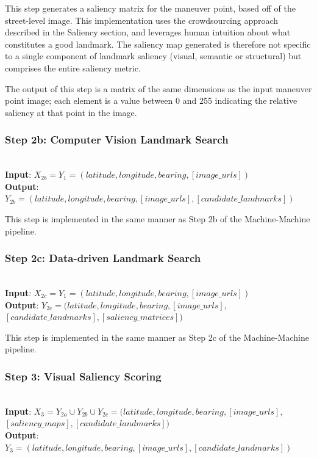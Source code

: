 This step generates a saliency matrix for the maneuver point, based off of the street-level image. This implementation uses the crowdsourcing approach described in the Saliency section, and leverages human intuition about what constitutes a good landmark. The saliency map generated is therefore not specific to a single component of landmark saliency (visual, semantic or structural) but comprises the entire saliency metric. 

The output of this step is a matrix of the same dimensions as the input maneuver point image; each element is a value between 0 and 255 indicating the relative saliency at that point in the image.

\subsubsection*{Step 2b: Computer Vision Landmark Search}~\\
\noindent\textbf{Input}: $X_{2b} = Y_1 = (latitude, longitude, bearing, [image\_urls])$\\
\textbf{Output}: $Y_{2b} = (latitude, longitude, bearing,  [image\_urls], [candidate\_landmarks] )$ 

This step is implemented in the same manner as Step 2b of the Machine-Machine pipeline.

\subsubsection*{Step 2c: Data-driven Landmark Search}~\\
\noindent\textbf{Input}: $X_{2c} = Y_1 = (latitude, longitude, bearing, [image\_urls])$\\
\textbf{Output}: $Y_{2c} = (latitude, longitude, bearing,  [image\_urls], $\\$[candidate\_landmarks], [saliency\_matrices] )$ 

This step is implemented in the same manner as Step 2c of the Machine-Machine pipeline.

\subsubsection*{Step 3: Visual Saliency Scoring}~\\
\noindent\textbf{Input}: $X_3 = Y_{2a} \cup Y_{2b} \cup Y_{2c} = (latitude, longitude, bearing,  [image\_urls],$\\$ [saliency\_maps], [candidate\_landmarks] )$\\
\textbf{Output}: $Y_3 = (latitude, longitude, bearing,  [image\_urls], [candidate\_landmarks] )$ 

